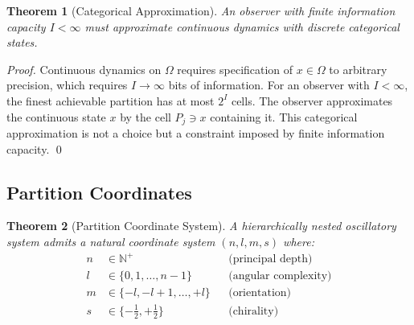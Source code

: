 \documentclass[twocolumn,10pt,a4paper]{article}
\newtheorem{theorem}{Theorem}[section]
\theoremstyle{definition}
\theoremstyle{remark}
\newcommand{\Natural}{\mathbb{N}}
\begin{document}
\begin{theorem}[Categorical Approximation]
\label{thm:categorical}
An observer with finite information capacity $I < \infty$ must approximate continuous dynamics with discrete categorical states.
\end{theorem}

\begin{proof}
Continuous dynamics on $\Omega$ requires specification of $x \in \Omega$ to arbitrary precision, which requires $I \to \infty$ bits of information. For an observer with $I < \infty$, the finest achievable partition has at most $2^I$ cells. The observer approximates the continuous state $x$ by the cell $P_j \ni x$ containing it. This categorical approximation is not a choice but a constraint imposed by finite information capacity. \qed
\end{proof}

\subsection{Partition Coordinates}

\begin{theorem}[Partition Coordinate System]
\label{thm:coordinates}
A hierarchically nested oscillatory system admits a natural coordinate system $(n, l, m, s)$ where:
\begin{align}
    n &\in \Natural^+ && \text{(principal depth)} \\
    l &\in \{0, 1, \ldots, n-1\} && \text{(angular complexity)} \\
    m &\in \{-l, -l+1, \ldots, +l\} && \text{(orientation)} \\
    s &\in \{-\tfrac{1}{2}, +\tfrac{1}{2}\} && \text{(chirality)}
\end{align}
\end{theorem}
\end{document}

